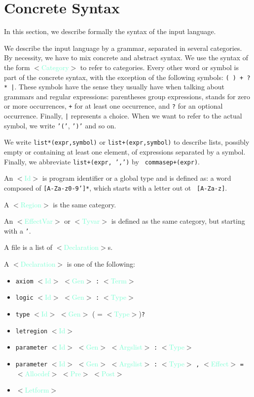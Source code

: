\documentclass[a4paper]{scrreprt}
\newcommand{\cat}[1]{$<$\textcolor{Aquamarine}{#1}$>$}
\begin{document}
\chapter{Concrete Syntax}

In this section, we describe formally the syntax of the input language.

We describe the input language by a grammar, separated in several categories.
By necessity, we have to mix concrete and abstract syntax. We use the syntax
of the form \cat{Category} to refer to categories. Every other word or symbol
is part of the concrete syntax, with the exception of the following symbols:
\texttt{( ) + ? * |}. These symbols have the sense they usually have when
talking about grammars and regular expressions: parentheses group expressions,
{\tt *} stands for zero or more occurrences, {\tt +} for at least one
occurrence, and {\tt ?} for an optional occurrence. Finally, {\tt |}
represents a choice.  When we want to refer to the actual symbol, we write
{\tt '('}, {\tt ')'} and so on.

We write {\tt list*(expr,symbol)} or {\tt list+(expr,symbol)} to describe
lists, possibly empty or containing at least one element, of expressions
separated by a symbol. Finally, we abbreviate {\tt list+(expr, ',')} by {\tt
commasep+(expr)}.

An \cat{Id} is program identifier or a global type and is defined as: a word
composed of {\tt [A-Za-z0-9']*}, which starts with a letter out ot {\tt
[A-Za-z]}.

A \cat{Region} is the same category.

An \cat{EffectVar} or \cat{Tyvar} is defined as the same category, 
but starting with a {\tt '}.

A file is a list of \cat{Declaration}s.

A \cat{Declaration} is one of the following: 
\begin{itemize}
  \item {\tt axiom} \cat{Id} \cat{Gen} {\tt :} \cat{Term}
  \item {\tt logic} \cat{Id} \cat{Gen} {\tt :} \cat{Type}
  \item {\tt type} \cat{Id} \cat{Gen}  ( = \cat{Type}){\tt ?}
  \item {\tt letregion} \cat{Id}
  \item {\tt parameter} \cat{Id} \cat{Gen} \cat{Argslist} {\tt :} \cat{Type}
  \item {\tt parameter} \cat{Id} \cat{Gen} \cat{Argslist} {\tt :} \cat{Type}
    {\tt ,} \cat{Effect} {\tt =} \cat{Allocdef} {\cat{Pre}} {\cat{Post}}
  \item \cat{Letform}
\end{itemize}
\end{document}
